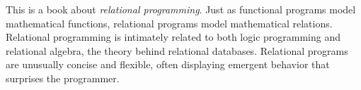 This is a book about \emph{relational programming}. 
%
Just as functional programs model mathematical functions, relational programs model mathematical relations.
%
Relational
programming is intimately related to both logic programming
and relational algebra, the theory behind relational databases.
%
Relational programs are unusually concise and flexible, often
displaying emergent behavior that surprises the programmer.
%








